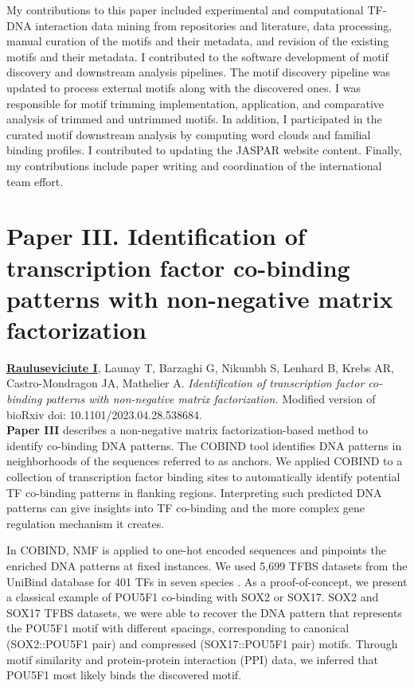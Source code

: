 My contributions to this paper included experimental and computational TF-DNA interaction data mining from repositories and literature, data processing, manual curation of the motifs and their metadata, and revision of the existing motifs and their metadata. I contributed to the software development of motif discovery and downstream analysis pipelines. The motif discovery pipeline was updated to process external motifs along with the discovered ones. I was responsible for motif trimming implementation, application, and comparative analysis of trimmed and untrimmed motifs. In addition, I participated in the curated motif downstream analysis by computing word clouds and familial binding profiles. I contributed to updating the JASPAR website content. Finally, my contributions include paper writing and coordination of the international team effort.

\section{Paper III. Identification of transcription factor co-binding patterns with non-negative matrix factorization}

\textbf{\underline{Rauluseviciute I}}, Launay T, Barzaghi G, Nikumbh S, Lenhard B, Krebs AR, Castro-Mondragon JA, Mathelier A. \textit{Identification of transcription factor co-binding patterns with non-negative matrix factorization.} Modified version of bioRxiv doi: 10.1101/2023.04.28.538684.
\\

\textbf{Paper III} describes a non-negative matrix factorization-based method to identify co-binding DNA patterns. The COBIND tool identifies DNA patterns in neighborhoods of the sequences referred to as anchors. We applied COBIND to a collection of transcription factor binding sites to automatically identify potential TF co-binding patterns in flanking regions. Interpreting such predicted DNA patterns can give insights into TF co-binding and the more complex gene regulation mechanism it creates.

In COBIND, NMF is applied to one-hot encoded sequences and pinpoints the enriched DNA patterns at fixed instances. We used 5,699 TFBS datasets from the UniBind database for 401 TFs in seven species \cite{puig2021unibind}. As a proof-of-concept, we present a classical example of POU5F1 co-binding with SOX2 or SOX17. SOX2 and SOX17 TFBS datasets, we were able to recover the DNA pattern that represents the POU5F1 motif with different spacings, corresponding to canonical (SOX2::POU5F1 pair) and compressed (SOX17::POU5F1 pair) motifs. Through motif similarity and protein-protein interaction (PPI) data, we inferred that POU5F1 most likely binds the discovered motif.

